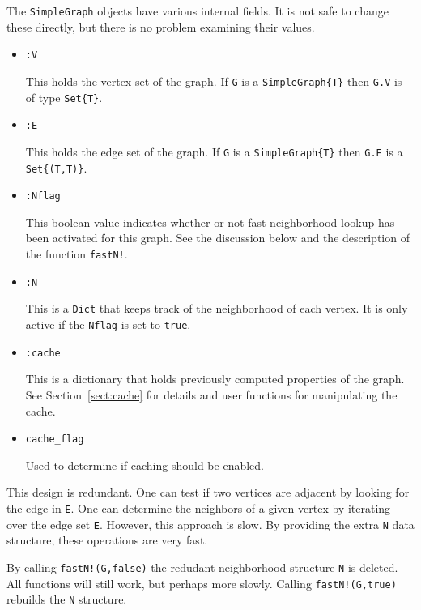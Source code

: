 \documentclass[oneside]{amsart}
\begin{document}
The \verb|SimpleGraph| objects have various internal fields. It is not
safe to change these directly, but there is no problem examining their
values.

\begin{itemize}
\item \verb|:V|

  This holds the vertex set of the graph. If \verb|G| is a
  \verb|SimpleGraph{T}| then \verb|G.V| is of type \verb|Set{T}|.

\item \verb|:E|

  This holds the edge set of the graph. If \verb|G| is a
  \verb|SimpleGraph{T}| then \verb|G.E| is a \verb|Set{(T,T)}|.

\item \verb|:Nflag|

  This boolean value indicates whether or not fast neighborhood lookup
  has been activated for this graph. See the discussion below and the
  description of the function \verb|fastN!|.

\item \verb|:N|

  This is a \verb|Dict| that keeps track of the neighborhood of each
  vertex. It is only active if the \verb|Nflag| is set to
  \verb|true|.

\item \verb|:cache|

  This is a dictionary that holds previously computed properties
  of the graph. See Section~\ref{sect:cache} for details and user
  functions for manipulating the cache.

\item \verb|cache_flag|

  Used to determine if caching should be enabled.

\end{itemize}



This design is redundant. One can test if two vertices are adjacent by
looking for the edge in \verb|E|.  One can determine the neighbors of
a given vertex by iterating over the edge set \verb|E|.  However, this
approach is slow. By providing the extra \verb|N| data structure,
these operations are very fast.

By calling \verb|fastN!(G,false)| the redudant neighborhood structure
\verb|N| is deleted. All functions will still work, but perhaps more
slowly. Calling \verb|fastN!(G,true)| rebuilds the \verb|N|
structure.
\end{document}
